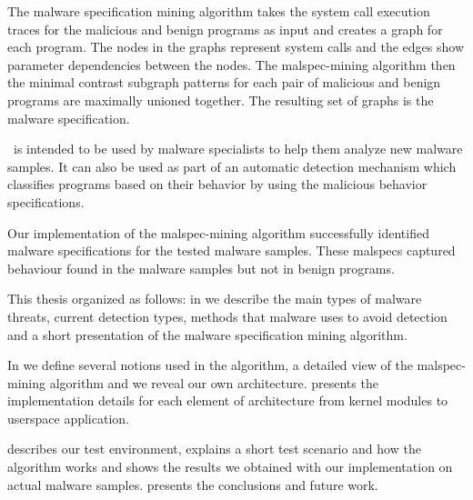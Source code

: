 The malware specification mining algorithm takes the system call execution traces for the malicious and benign programs as input and creates a graph for each program. The nodes in the graphs represent system calls and the edges show parameter dependencies between the nodes. The malspec-mining algorithm then the minimal contrast subgraph patterns for each pair of malicious and benign programs are maximally unioned together. The resulting set of graphs is the malware specification.

\project\ is intended to be used by malware specialists to help them analyze new malware samples. It can also be used as part of an automatic detection mechanism which classifies programs based on their behavior by using the malicious behavior specifications.

Our implementation of the malspec-mining algorithm successfully identified malware specifications for the tested malware samples. These malspecs captured behaviour found in the malware samples but not in benign programs.

This thesis organized as follows: in  we describe the main types of malware threats, current detection types, methods that malware uses to avoid detection and a short presentation of the malware specification mining algorithm.

In  we define several notions used in the algorithm, a detailed view of the malspec-mining algorithm and we reveal our own architecture.  presents the implementation details for each element of architecture from kernel modules to userspace application.

 describes our test environment, explains a short test scenario and how the algorithm works and shows the results we obtained with our implementation on actual malware samples.  presents the conclusions and future work.